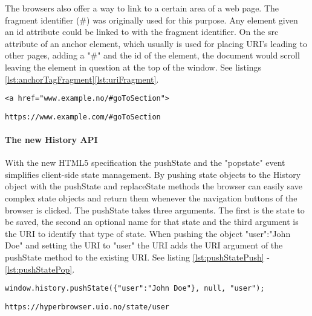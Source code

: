 \documentclass[english]{ifimaster}
\begin{document}
The browsers also offer a way to link to a certain area of a web page. The fragment identifier (\#) was originally used for this purpose. Any element given an id attribute could be linked to with the fragment identifier. On the src attribute of an anchor element, which usually is used for placing URI's leading to other pages, adding a "\#" and the id of the element, the document would scroll leaving the element in question at the top of the window. See listings \ref{lst:anchorTagFragment}\ref{lst:uriFragment}.

\begin{lstlisting}[caption= {The anchor element with fragment identifier (\#).},label={lst:anchorTagFragment}]
<a href="www.example.no/#goToSection">
\end{lstlisting}

\begin{lstlisting}[caption= {The browser's address field after clicking a link with a fragment identifier.},label={lst:uriFragment}]
  https://www.example.com/#goToSection
\end{lstlisting}

\paragraph{The new History API}
\label{sec:pushStateBack}
With the new HTML5 specification the pushState and the "popstate" event simplifies client-side state management. By pushing state objects to the History object with the pushState and replaceState methods the browser can easily save complex state objects and return them whenever the navigation buttons of the browser is clicked. The pushState takes three arguments. The first is the state to be saved, the second an optional name for that state and the third argument is the URI to identify that type of state. When pushing the object {"user":"John Doe"} and setting the URI to "user" the URI adds the URI argument of the pushState method to the existing URI. See listing \ref{lst:pushStatePush} - \ref{lst:pushStatePop}.

\begin{lstlisting}[caption= {Pushing state with the History API.},label={lst:pushStatePush}]
window.history.pushState({"user":"John Doe"}, null, "user");
\end{lstlisting}

\begin{lstlisting}[caption= {The URI when pushing {user:"John Doe"} to the History.},label={lst:pushStateURI}]
  https://hyperbrowser.uio.no/state/user
\end{lstlisting}
\end{document}
